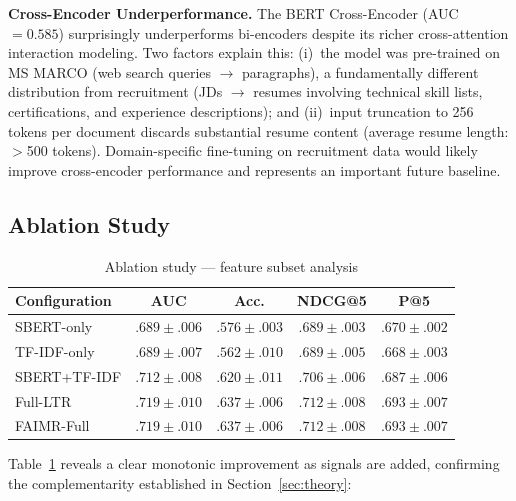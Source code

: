 \documentclass[smallcondensed,numbers]{sn-jnl}
\begin{document}
\textbf{Cross-Encoder Underperformance.} The BERT Cross-Encoder (AUC~$= 0.585$) surprisingly underperforms bi-encoders despite its richer cross-attention interaction modeling. Two factors explain this: (i)~the model was pre-trained on MS MARCO (web search queries $\to$ paragraphs), a fundamentally different distribution from recruitment (JDs $\to$ resumes involving technical skill lists, certifications, and experience descriptions); and (ii)~input truncation to 256 tokens per document discards substantial resume content (average resume length: $>$500 tokens). Domain-specific fine-tuning on recruitment data would likely improve cross-encoder performance and represents an important future baseline.

\subsection{Ablation Study}

\begin{table}[t]
\centering
\caption{Ablation study --- feature subset analysis}
\label{tab:ablation}
\begin{tabular}{lcccc}
\toprule
Configuration & AUC & Acc. & NDCG@5 & P@5 \\
\midrule
SBERT-only      & $.689 \pm .006$ & $.576 \pm .003$ & $.689 \pm .003$ & $.670 \pm .002$ \\
TF-IDF-only     & $.689 \pm .007$ & $.562 \pm .010$ & $.689 \pm .005$ & $.668 \pm .003$ \\
SBERT+TF-IDF    & $.712 \pm .008$ & $.620 \pm .011$ & $.706 \pm .006$ & $.687 \pm .006$ \\
Full-LTR        & $\mathbf{.719 \pm .010}$ & $\mathbf{.637 \pm .006}$ & $\mathbf{.712 \pm .008}$ & $\mathbf{.693 \pm .007}$ \\
FAIMR-Full      & $\mathbf{.719 \pm .010}$ & $\mathbf{.637 \pm .006}$ & $\mathbf{.712 \pm .008}$ & $\mathbf{.693 \pm .007}$ \\
\bottomrule
\end{tabular}
\end{table}

Table~\ref{tab:ablation} reveals a clear monotonic improvement as signals are added, confirming the complementarity established in Section~\ref{sec:theory}:
\end{document}
